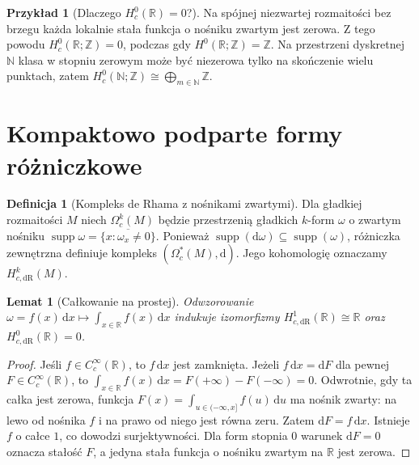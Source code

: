 \documentclass[11pt,a4paper,oneside]{report}
\newcommand{\R}{\mathbb{R}}
\newcommand{\N}{\mathbb{N}}
\newcommand{\Z}{\mathbb{Z}}
\newcommand{\dd}{\mathrm d}
\theoremstyle{plain}
\newtheorem{lemat}[twierdzenie]{Lemat}
\theoremstyle{definition}
\newtheorem{definicja}[twierdzenie]{Definicja}
\newtheorem{przyklad}[twierdzenie]{Przykład}
\theoremstyle{remark}
\begin{document}
\begin{przyklad}[Dlaczego $H_c^0(\R)=0$?]
Na spójnej niezwartej rozmaitości bez brzegu
każda lokalnie stała funkcja o nośniku zwartym jest zerowa.
Z tego powodu $H_c^0(\R;\Z)=0$, podczas gdy
$H^0(\R;\Z)=\Z$. Na przestrzeni dyskretnej $\N$
klasa w stopniu zerowym może być niezerowa tylko na
skończenie wielu punktach, zatem
$H_c^0(\N;\Z)\cong\bigoplus_{m\in\N}\Z$.
\end{przyklad}

\section{Kompaktowo podparte formy różniczkowe}
\begin{definicja}[Kompleks de Rhama z nośnikami zwartymi]
Dla gładkiej rozmaitości $M$ niech $\Omega_c^k(M)$ będzie
przestrzenią gładkich $k$-form $\omega$ o zwartym nośniku
$\operatorname{supp}\omega=\overline{\{x:\omega_x\ne0\}}$.
Ponieważ $\operatorname{supp}(\dd\omega)\subseteq
\operatorname{supp}(\omega)$, różniczka zewnętrzna definiuje
kompleks $(\Omega_c^*(M),\dd)$. Jego kohomologię oznaczamy
$H_{c,\mathrm{dR}}^k(M)$.
\end{definicja}

\begin{lemat}[Całkowanie na prostej]
\label{lem:compact-R-v11}
Odwzorowanie $\omega=f(x)\,\dd x\mapsto
\int_{x\in\R}f(x)\,\dd x$ indukuje izomorfizmy
$H_{c,\mathrm{dR}}^1(\R)\cong\R$ oraz
$H_{c,\mathrm{dR}}^0(\R)=0$.
\end{lemat}
\begin{proof}
Jeśli $f\in C_c^\infty(\R)$, to $f\,\dd x$ jest zamknięta.
Jeżeli $f\,\dd x=\dd F$ dla pewnej
$F\in C_c^\infty(\R)$, to
$\int_{x\in\R}f(x)\,\dd x=F(+\infty)-F(-\infty)=0$.
Odwrotnie, gdy ta całka jest zerowa, funkcja
$F(x)=\int_{u\in(-\infty,x]} f(u)\,\dd u$ ma nośnik
zwarty: na lewo od nośnika $f$ i na prawo od niego
jest równa zeru. Zatem $\dd F=f\,\dd x$.
Istnieje $f$ o całce $1$, co dowodzi surjektywności.
Dla form stopnia $0$ warunek $\dd F=0$ oznacza
stałość $F$, a jedyna stała funkcja o nośniku zwartym
na $\R$ jest zerowa.
\end{proof}
\end{document}
